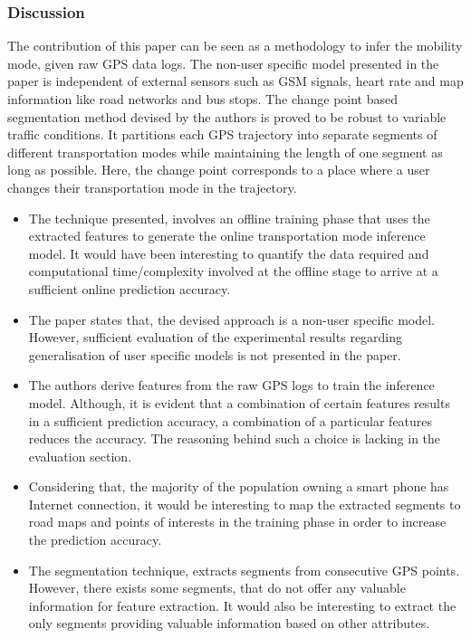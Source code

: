 \subsubsection*{Discussion}

The contribution of this paper can be seen as a methodology to infer the mobility mode, given raw GPS
data logs. The non-user specific model presented in the paper is independent of external sensors
such as GSM signals, heart rate and map information like road networks and bus stops. The change
point based segmentation method devised by the authors is proved to be robust to variable traffic
conditions. It partitions each GPS trajectory into separate segments of different transportation
modes while maintaining the length of one segment as long as possible. Here, the change point 
corresponds to a place where a user changes their transportation mode in the trajectory.  

\begin{itemize}

\item The technique presented, involves an offline training phase that uses the extracted features
to generate the online transportation mode inference model. It would have been interesting to quantify
the data required and computational time/complexity involved at the offline stage to arrive at a 
sufficient online prediction accuracy.

\item The paper states that, the devised approach is a non-user specific model. However, sufficient
evaluation of the experimental results regarding generalisation of user specific models is not presented
in the paper.

\item The authors derive features from the raw GPS logs to train the inference model. Although,
it is evident that a combination of certain features results in a sufficient prediction accuracy, a
combination of a particular features reduces the accuracy. The reasoning behind such a choice is
lacking in the evaluation section.

\item Considering that, the majority of the population owning a smart phone has Internet connection, 
it would be interesting to map the extracted segments to road maps and points of interests in the 
training phase in order to increase the prediction accuracy.

\item The segmentation technique, extracts segments from consecutive GPS points. However, there
exists some segments, that do not offer any valuable information for feature extraction. It would
also be interesting to extract the only segments providing valuable information based on other
attributes.
\end{itemize}